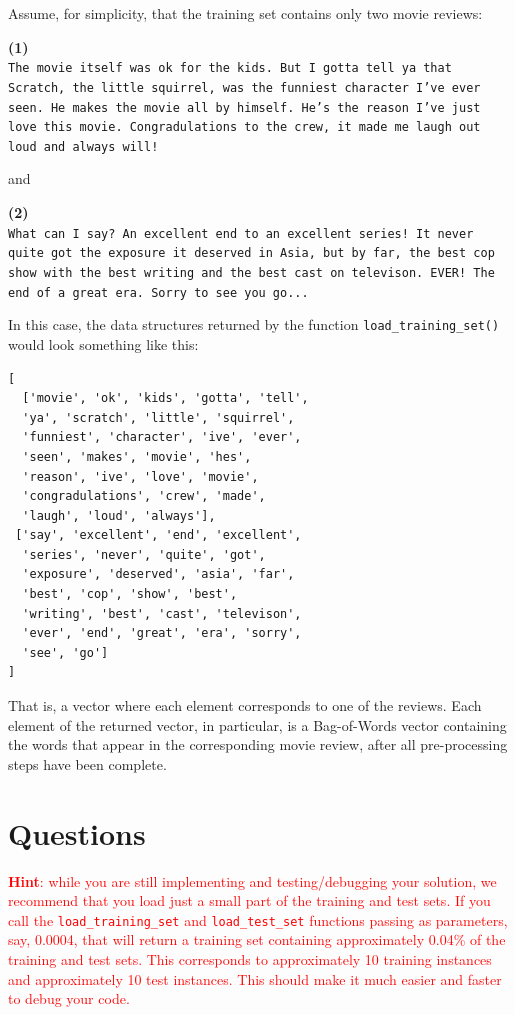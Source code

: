 \documentclass[letterpaper]{article}
\begin{document}
Assume, for simplicity, that the training set contains only two movie reviews:

\noindent \textbf{(1)} \\
\noindent \texttt{The movie itself was ok for the kids. But I gotta tell ya that Scratch, the little squirrel, was the funniest character I've ever seen. He makes the movie all by himself. He's the reason I've just love this movie. Congradulations to the crew, it made me laugh out loud and always will!}

\noindent and

\noindent \textbf{(2)} \\
\noindent \texttt{What can I say? An excellent end to an excellent series! It never quite got the exposure it deserved in Asia, but by far, the best cop show with the best writing and the best cast on televison. EVER! The end of a great era. Sorry to see you go...}

In this case, the data structures returned by the function \texttt{load\_training\_set()} would look something like this:

\noindent \begin{verbatim}
[
  ['movie', 'ok', 'kids', 'gotta', 'tell',
  'ya', 'scratch', 'little', 'squirrel',
  'funniest', 'character', 'ive', 'ever',
  'seen', 'makes', 'movie', 'hes',
  'reason', 'ive', 'love', 'movie',
  'congradulations', 'crew', 'made',
  'laugh', 'loud', 'always'],
 ['say', 'excellent', 'end', 'excellent',
  'series', 'never', 'quite', 'got',
  'exposure', 'deserved', 'asia', 'far',
  'best', 'cop', 'show', 'best',
  'writing', 'best', 'cast', 'televison',
  'ever', 'end', 'great', 'era', 'sorry',
  'see', 'go']
]
\end{verbatim}

\noindent That is, a vector where each element corresponds to one of the reviews. Each element of the returned vector, in particular, is a Bag-of-Words vector containing the words that appear in the corresponding movie review, after all pre-processing steps have been complete.




\section{Questions}

\textcolor{red}{\textbf{Hint}: while you are still implementing and testing/debugging your solution, we recommend that you load just a small part of the training and test sets. If you call the \texttt{load\_training\_set} and \texttt{load\_test\_set} functions passing as parameters, say, 0.0004, that will return a training set containing approximately 0.04\% of the training and test sets. This corresponds to approximately 10 training instances and approximately 10 test instances. This should make it much easier and faster to debug your code.}
\end{document}
